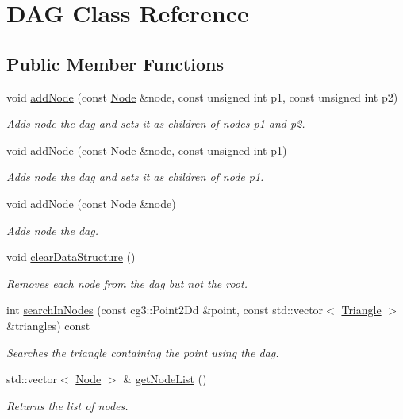 \hypertarget{classDAG}{}\section{D\+AG Class Reference}
\label{classDAG}
\subsection*{Public Member Functions}
\begin{DoxyCompactItemize}
\item 
void \hyperlink{classDAG_a6ebf33d453b2eb82b743fd0e26bba0d6}{add\+Node} (const \hyperlink{classNode}{Node} \&node, const unsigned int p1, const unsigned int p2)
\begin{DoxyCompactList}\small\item\em Adds node the dag and sets it as children of nodes p1 and p2. \end{DoxyCompactList}\item 
void \hyperlink{classDAG_aefedbbae88ee9dcc991b436f38fd6509}{add\+Node} (const \hyperlink{classNode}{Node} \&node, const unsigned int p1)
\begin{DoxyCompactList}\small\item\em Adds node the dag and sets it as children of node p1. \end{DoxyCompactList}\item 
void \hyperlink{classDAG_a88682a026a8f2931dbe64fc5085430ec}{add\+Node} (const \hyperlink{classNode}{Node} \&node)
\begin{DoxyCompactList}\small\item\em Adds node the dag. \end{DoxyCompactList}\item 
\mbox{\label{classDAG_a04bf7ea8f5319b8dbcf2814d5c42e292}} 
void \hyperlink{classDAG_a04bf7ea8f5319b8dbcf2814d5c42e292}{clear\+Data\+Structure} ()
\begin{DoxyCompactList}\small\item\em Removes each node from the dag but not the root. \end{DoxyCompactList}\item 
int \hyperlink{classDAG_addd2c3b6de47c3873bb6c0bd074f2a67}{search\+In\+Nodes} (const cg3\+::\+Point2\+Dd \&point, const std\+::vector$<$ \hyperlink{classTriangle}{Triangle} $>$ \&triangles) const
\begin{DoxyCompactList}\small\item\em Searches the triangle containing the point using the dag. \end{DoxyCompactList}\item 
std\+::vector$<$ \hyperlink{classNode}{Node} $>$ \& \hyperlink{classDAG_af8afaefe800c1eb05ef631e148692c2d}{get\+Node\+List} ()
\begin{DoxyCompactList}\small\item\em Returns the list of nodes. \end{DoxyCompactList}\end{DoxyCompactItemize}


